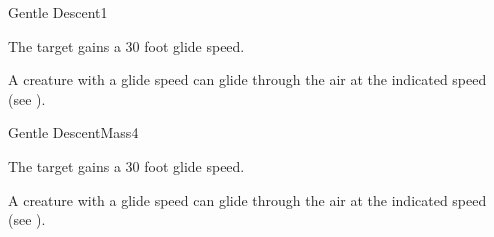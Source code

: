 \begin{spellsection}{Gentle Descent}{1}
\begin{spellheader}
\end{spellheader}
\begin{spellcontent}
    \begin{spelltargetinginfo}
    \end{spelltargetinginfo}
    \begin{spelleffects}
        \spelleffect The target gains a 30 foot glide speed.
        \spelldur \durshort
    \end{spelleffects}
\end{spellcontent}
\begin{spellfooter}
    \spellnotes A creature with a glide speed can glide through the air at the indicated speed (see ).
\end{spellfooter}
\end{spellsection}

\begin{spellsection}{Gentle Descent}{Mass}{4}
\begin{spellheader}
\end{spellheader}
\begin{spellcontent}
    \begin{spelltargetinginfo}
    \end{spelltargetinginfo}
    \begin{spelleffects}
        \spelleffect The target gains a 30 foot glide speed.
        \spelldur \durshort
    \end{spelleffects}
\end{spellcontent}
\begin{spellfooter}
    \spellnotes A creature with a glide speed can glide through the air at the indicated speed (see ).
\end{spellfooter}
\end{spellsection}

